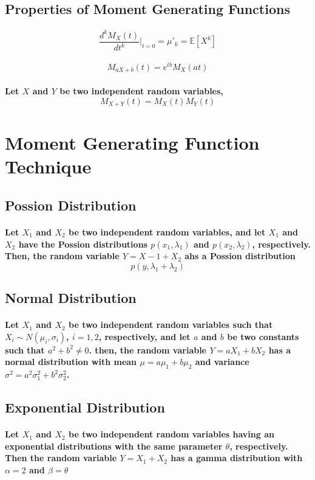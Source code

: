 \documentclass[titlepage]{article}
\begin{document}
        \subsection{Properties of Moment Generating Functions}
            \paragraph{
                $$\frac{d^kM_X(t)}{dt^k}|_{t=0}=\mu'_k=\mathbb{E}[X^k]$$
            }
            \paragraph{
                $$M_{aX+b}(t)=e^{tb}M_X(at)$$
            }
            \paragraph{
                Let $X$ and $Y$ be two independent random variables,
                $$M_{X+Y}(t)=M_X(t)M_Y(t)$$
            }
    \section{Moment Generating Function Technique}
        \subsection{Possion Distribution}
            \paragraph{
                Let $X_1$ and $X_2$ be two independent random variables, and let $X_1$ and $X_2$ have the Possion distributions $p(x_1,\lambda_1)$ and $p(x_2,\lambda_2)$, respectively. Then, the random variable $Y=X-1+X_2$ ahs a Possion distribution $$p(y,\lambda_1+\lambda_2)$$
            }
        \subsection{Normal Distribution}
            \paragraph{
                Let $X_1$ and $X_2$ be two independent random variables such that $X_i\sim N(\mu_i,\sigma_i)$, $i=1,2$, respectively, and let $a$ and $b$ be two constants such that $a^2+b^2\neq 0$. then, the random variable $Y=aX_1+bX_2$ has a normal distribution with mean $\mu=a\mu_1+b\mu_2$ and variance $\sigma^2=a^2\sigma_1^2+b^2\sigma_2^2$.
            }
        \subsection{Exponential Distribution}
            \paragraph{
                Let $X_1$ and $X_2$ be two independent random variables having an exponential distributions with the same parameter $\theta$, respectively. Then the random variable $Y=X_1+X_2$ has a gamma distribution with $\alpha=2$ and $\beta=\theta$
            }
\end{document}
